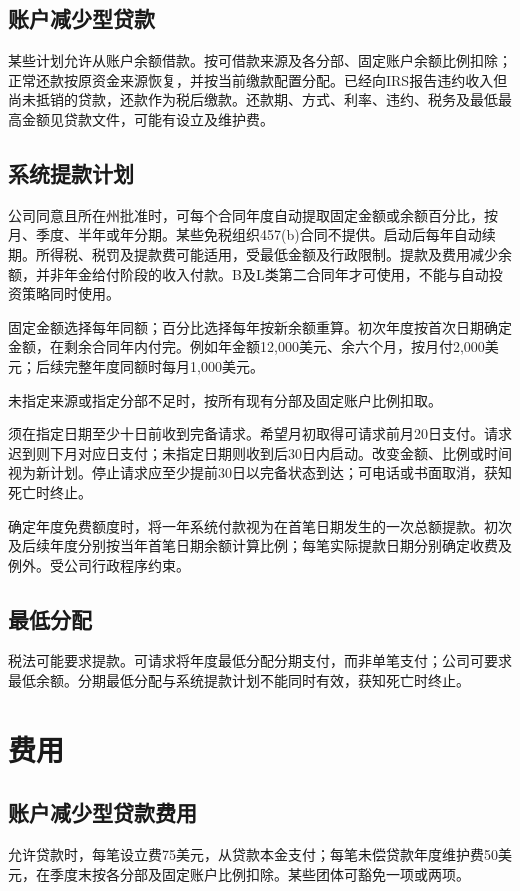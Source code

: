 \documentclass[UTF8,fontset=none,11pt,a4paper]{ctexart}
\begin{document}
\subsection*{账户减少型贷款}
某些计划允许从账户余额借款。按可借款来源及各分部、固定账户余额比例扣除；正常还款按原资金来源恢复，并按当前缴款配置分配。已经向IRS报告违约收入但尚未抵销的贷款，还款作为税后缴款。还款期、方式、利率、违约、税务及最低最高金额见贷款文件，可能有设立及维护费。


\subsection*{系统提款计划}
公司同意且所在州批准时，可每个合同年度自动提取固定金额或余额百分比，按月、季度、半年或年分期。某些免税组织457(b)合同不提供。启动后每年自动续期。所得税、税罚及提款费可能适用，受最低金额及行政限制。提款及费用减少余额，并非年金给付阶段的收入付款。B及L类第二合同年才可使用，不能与自动投资策略同时使用。


固定金额选择每年同额；百分比选择每年按新余额重算。初次年度按首次日期确定金额，在剩余合同年内付完。例如年金额12,000美元、余六个月，按月付2,000美元；后续完整年度同额时每月1,000美元。


未指定来源或指定分部不足时，按所有现有分部及固定账户比例扣取。


须在指定日期至少十日前收到完备请求。希望月初取得可请求前月20日支付。请求迟到则下月对应日支付；未指定日期则收到后30日内启动。改变金额、比例或时间视为新计划。停止请求应至少提前30日以完备状态到达；可电话或书面取消，获知死亡时终止。


确定年度免费额度时，将一年系统付款视为在首笔日期发生的一次总额提款。初次及后续年度分别按当年首笔日期余额计算比例；每笔实际提款日期分别确定收费及例外。受公司行政程序约束。


\subsection*{最低分配}
税法可能要求提款。可请求将年度最低分配分期支付，而非单笔支付；公司可要求最低余额。分期最低分配与系统提款计划不能同时有效，获知死亡时终止。


\section*{费用}
\subsection*{账户减少型贷款费用}
允许贷款时，每笔设立费75美元，从贷款本金支付；每笔未偿贷款年度维护费50美元，在季度末按各分部及固定账户比例扣除。某些团体可豁免一项或两项。
\end{document}
